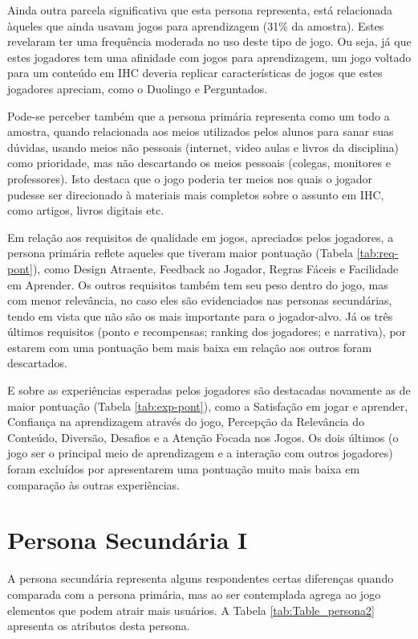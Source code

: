 Ainda outra parcela significativa que esta persona representa, está relacionada àqueles que ainda usavam jogos para aprendizagem (31\% da amostra). Estes revelaram ter uma frequência moderada no uso deste tipo de jogo. Ou seja, já que estes jogadores tem uma afinidade com jogos para aprendizagem, um jogo voltado para um conteúdo em IHC deveria replicar características de jogos que estes jogadores apreciam, como o Duolingo e Perguntados.

Pode-se perceber também que a persona primária representa como um todo a amostra, quando relacionada aos meios utilizados pelos alunos para sanar suas dúvidas, usando meios não pessoais (internet, video aulas e livros da disciplina) como prioridade, mas não descartando os meios pessoais (colegas, monitores e professores). Isto destaca que o jogo poderia ter meios nos quais o jogador pudesse ser direcionado à materiais mais completos sobre o assunto em IHC, como artigos, livros digitais etc.

Em relação aos requisitos de qualidade em jogos, apreciados pelos jogadores, a persona primária reflete aqueles que tiveram maior pontuação (Tabela \ref{tab:req-pont}), como Design Atraente, Feedback ao Jogador, Regras Fáceis e Facilidade em Aprender. Os outros requisitos também tem seu peso dentro do jogo, mas com menor relevância, no caso eles são evidenciados nas personas secundárias, tendo em vista que não são os mais importante para o jogador-alvo. Já os três últimos requisitos (ponto e recompensas; ranking dos jogadores; e narrativa), por estarem com uma pontuação bem mais baixa em relação aos outros foram descartados.  

E sobre as experiências esperadas pelos jogadores são destacadas novamente as de maior pontuação (Tabela \ref{tab:exp-pont}), como a Satisfação em jogar e aprender, Confiança na aprendizagem através do jogo, Percepção da Relevância do Conteúdo, Diversão, Desafios e a Atenção Focada nos Jogos. Os dois últimos (o jogo ser o principal meio de aprendizagem e a interação com outros jogadores) foram excluídos por apresentarem uma pontuação muito mais baixa em comparação às outras experiências. 

\section{Persona Secundária I}
\label{sec:p2}

A persona secundária representa alguns respondentes certas diferenças quando comparada com a persona primária, mas ao ser contemplada agrega ao jogo elementos que podem atrair mais usuários. A Tabela \ref{tab:Table_persona2} apresenta os atributos desta persona.

